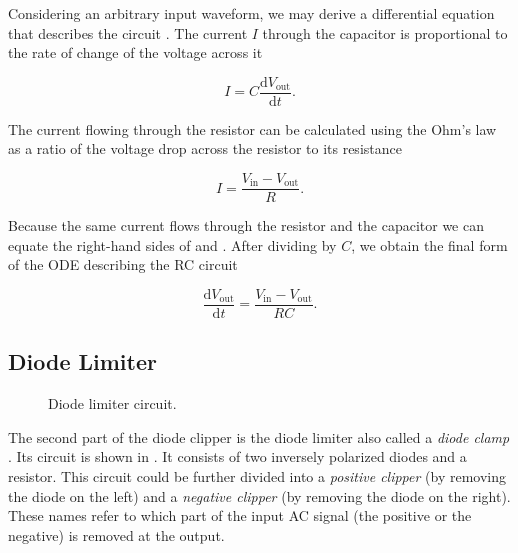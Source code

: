 Considering an arbitrary input waveform, we may derive a differential equation that describes the circuit \cite{Horowitz2015}. The current $I$ through the capacitor is proportional to the rate of change of the voltage across it

\begin{equation}
  I = C \frac{\mathrm{d}V_\text{out}}{\mathrm{d} t}.
  \label{eq:current_through_capacitor}
\end{equation}

The current flowing through the resistor can be calculated using the Ohm's law as a ratio of the voltage drop across the resistor to its resistance

\begin{equation}
  I = \frac{V_\text{in} - V_\text{out}}{R}.
  \label{eq:current_through_resistor}
\end{equation}

Because the same current flows through the resistor and the capacitor we can equate the right-hand sides of  and . After dividing by $C$, we obtain the final form of the \ac{ODE} describing the RC circuit

\begin{equation}
  \frac{\mathrm{d}V_\text{out}}{\mathrm{d} t} = \frac{V_\text{in} - V_\text{out}}{RC}.
\end{equation}



\subsection{Diode Limiter}
\begin{figure}
  \centering
  
  \caption{Diode limiter circuit.}
  \label{fig:diode_limiter}
\end{figure}

The second part of the diode clipper is the diode limiter also called a \emph{diode clamp} \cite{Malvino2016}. Its circuit is shown in . It consists of two inversely polarized diodes and a resistor. This circuit could be further divided into a \emph{positive clipper} (by removing the diode on the left) and a \emph{negative clipper} (by removing the diode on the right). These names refer to which part of the input \ac{AC} signal (the positive or the negative) is removed at the output.

